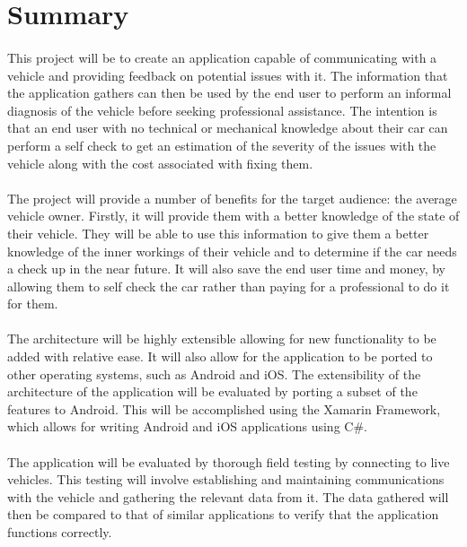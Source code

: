 \section{Summary}
	\paragraph{}{
	This project will be to create an application capable of communicating with a vehicle and providing feedback on potential issues with it. The information that the application gathers can then be used by the end user to perform an informal diagnosis of the vehicle before seeking professional assistance. The intention is that an end user with no technical or mechanical knowledge about their car can perform a self check to get an estimation of the severity of the issues with the vehicle along with the cost associated with fixing them.
	}
	\paragraph{}{
	The project will provide a number of benefits for the target audience: the average vehicle owner. Firstly, it will provide them with a better knowledge of the state of their vehicle. They will be able to use this information to give them a better knowledge of the inner workings of their vehicle and to determine if the car needs a check up in the near future. It will also save the end user time and money, by allowing them to self check the car rather than paying for a professional to do it for them.
	}
	\paragraph{}
	{
	The architecture will be highly extensible allowing for new functionality to be added with relative ease. It will also allow for the application to be ported to other operating systems, such as Android and iOS. The extensibility of the architecture of the application will be evaluated by porting a subset of the features to Android. This will be accomplished using the Xamarin Framework, which allows for writing Android and iOS applications using C{\#}.
	}
	\paragraph{}
	{
	The application will be evaluated by thorough field testing by connecting to live vehicles. This testing will involve establishing and maintaining communications with the vehicle and gathering the relevant data from it. The data gathered will then be compared to that of similar applications to verify that the application functions correctly.
	}
	
